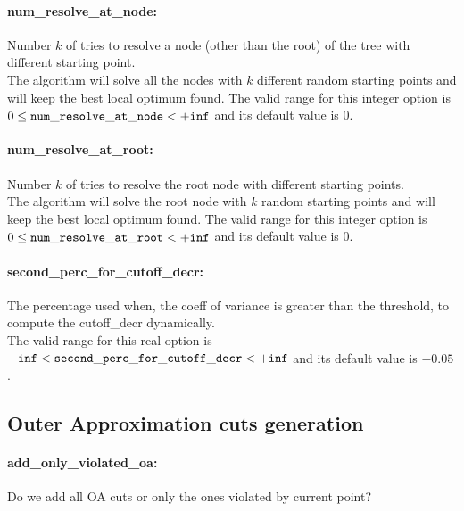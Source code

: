\paragraph{\bf num\_resolve\_at\_node:}\label{sec:num_resolve_at_node} Number $k$ of tries to resolve a node (other than the root) of the tree with different starting point. $\;$ \\
 The algorithm will solve all the nodes with $k$
different random starting points and will keep
the best local optimum found. The valid range for this integer option is
$0 \le {\tt num\_resolve\_at\_node } <  {\tt +inf}$
and its default value is $0$.


\paragraph{\bf num\_resolve\_at\_root:}\label{sec:num_resolve_at_root} Number $k$ of tries to resolve the root node with different starting points. $\;$ \\
 The algorithm will solve the root node with $k$
random starting points and will keep the best
local optimum found. The valid range for this integer option is
$0 \le {\tt num\_resolve\_at\_root } <  {\tt +inf}$
and its default value is $0$.


\paragraph{\bf second\_perc\_for\_cutoff\_decr:}\label{sec:second_perc_for_cutoff_decr} The percentage used when, the coeff of variance is greater than the threshold, to compute the cutoff\_decr dynamically. $\;$ \\
 The valid range for this real option is 
${\tt -inf} <  {\tt second\_perc\_for\_cutoff\_decr } <  {\tt +inf}$
and its default value is $-0.05$.


\subsection{Outer Approximation cuts generation}
\label{sec:Outer_Approximation_cuts_generation}
\paragraph{\bf add\_only\_violated\_oa:}\label{sec:add_only_violated_oa} Do we add all OA cuts or only the ones violated by current point? $\;$ \\

